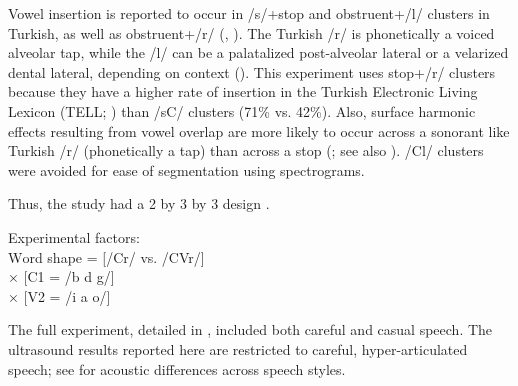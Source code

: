 \documentclass[output=paper,colorlinks,citecolor=brown]{langscibook}
\begin{document}
Vowel insertion is reported to occur in /s/+stop and obstruent+/l/ clusters in Turkish, as well as obstruent+/r/ (\citealt{Yavas1980}, \citealt{ClementsSezer:1982}). The Turkish /r/ is phonetically a voiced alveolar tap, while the /l/ can be a palatalized post-alveolar lateral or a velarized dental lateral, depending on context (\citealt{GokselKerslake2005}).  This experiment uses stop+/r/ clusters because they have a higher rate of insertion in the Turkish Electronic Living Lexicon (TELL; \cite{Inkelasetal2000}) than /sC/ clusters (71\% vs. 42\%). Also, surface harmonic effects resulting from vowel overlap are more likely to occur across a sonorant like Turkish /r/ (phonetically a tap) than across a stop (\citealt{Hall:2003, Hall2006}; see also \citealt{Bradley2004}). /Cl/ clusters were avoided for ease of segmentation using spectrograms.

Thus, the study had a 2 by 3 by 3 design .

\begin{exe}
    \ex \label{exfactors} Experimental factors: \\
    \textsc{W}ord shape = [/Cr/ vs. /CVr/]\\
× [C1 = /b d g/]\\
× [V2 = /i a o/]\\
    
\end{exe}


The full experiment, detailed in \citet[ch. 2]{Bellik2019a}, included both careful and casual speech. The ultrasound results reported here are restricted to careful, hyper-articulated speech; see \citet{Bellik2019b} for acoustic differences across speech styles.
\end{document}
